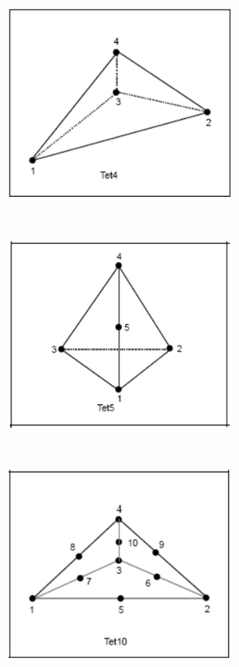 \begin{figure}
\begin{center}
{\includegraphics[width=2.9in, height=2.9in]{topology/tet04.png}}
{\includegraphics[width=2.9in, height=2.9in]{topology/tet05.png}}
{\includegraphics[width=2.9in, height=2.9in]{topology/tet10.png}}

\end{center}
\end{figure}
